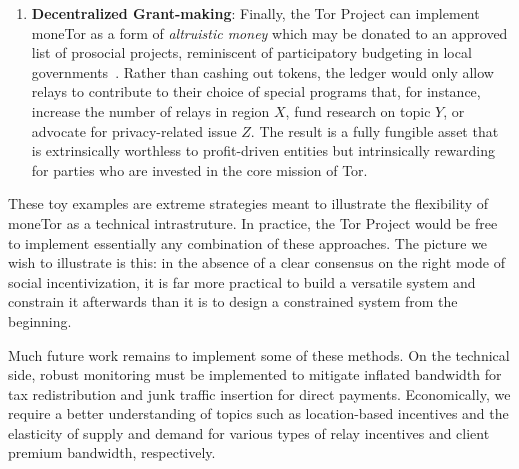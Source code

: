 \begin{enumerate}
\item \textbf{Decentralized Grant-making}: Finally, the Tor Project can
implement moneTor as a form of \emph{altruistic money} which may be donated to
an approved list of prosocial projects, reminiscent of participatory budgeting
in local governments~\cite{cabannes2004participatory}. Rather than cashing out
tokens, the ledger would only allow relays to contribute to their choice of
special programs that, for instance, increase the number of relays in region
$X$, fund research on topic $Y$, or advocate for privacy-related issue $Z$.
The result is a fully fungible asset that is extrinsically worthless to
profit-driven entities but intrinsically rewarding for parties who are invested
in the core mission of Tor.

\end{enumerate}

These toy examples are extreme strategies meant to illustrate the flexibility of
moneTor as a technical intrastruture. In practice, the Tor Project would be free
to implement essentially any combination of these approaches. The picture we
wish to illustrate is this: in the absence of a clear consensus on the right
mode of social incentivization, it is far more practical to build a versatile
system and constrain it afterwards than it is to design a constrained system
from the beginning.

Much future work remains to implement some of these methods. On the technical
side, robust monitoring must be implemented to mitigate inflated bandwidth for
tax redistribution and junk traffic insertion for direct payments. Economically,
we require a better understanding of topics such as location-based incentives
and the elasticity of supply and demand for various types of relay incentives
and client premium bandwidth, respectively.

